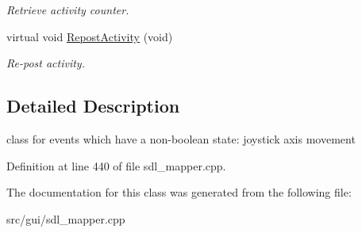 \begin{DoxyCompactItemize}
\begin{DoxyCompactList}\small\item\em Retrieve activity counter. \end{DoxyCompactList}\item 
\hypertarget{classCContinuousEvent_a55ff5be014e082075eaeec0af43a51aa}{virtual void \hyperlink{classCContinuousEvent_a55ff5be014e082075eaeec0af43a51aa}{Repost\-Activity} (void)}\label{classCContinuousEvent_a55ff5be014e082075eaeec0af43a51aa}

\begin{DoxyCompactList}\small\item\em Re-\/post activity. \end{DoxyCompactList}\end{DoxyCompactItemize}


\subsection{Detailed Description}
class for events which have a non-\/boolean state\-: joystick axis movement 

Definition at line 440 of file sdl\-\_\-mapper.\-cpp.



The documentation for this class was generated from the following file\-:\begin{DoxyCompactItemize}
\item 
src/gui/sdl\-\_\-mapper.\-cpp\end{DoxyCompactItemize}
